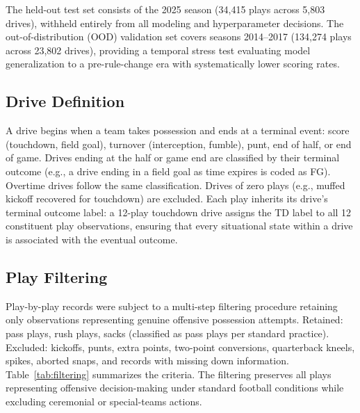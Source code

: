 \documentclass[12pt,a4paper]{article}
\begin{document}
The held-out test set consists of the 2025 season (34,415 plays across 5,803 drives), withheld entirely from all modeling and hyperparameter decisions. The out-of-distribution (OOD) validation set covers seasons 2014--2017 (134,274 plays across 23,802 drives), providing a temporal stress test evaluating model generalization to a pre-rule-change era with systematically lower scoring rates.

\subsection{Drive Definition}

A drive begins when a team takes possession and ends at a terminal event: score (touchdown, field goal), turnover (interception, fumble), punt, end of half, or end of game. Drives ending at the half or game end are classified by their terminal outcome (e.g., a drive ending in a field goal as time expires is coded as FG). Overtime drives follow the same classification. Drives of zero plays (e.g., muffed kickoff recovered for touchdown) are excluded. Each play inherits its drive's terminal outcome label: a 12-play touchdown drive assigns the TD label to all 12 constituent play observations, ensuring that every situational state within a drive is associated with the eventual outcome.

\subsection{Play Filtering}

Play-by-play records were subject to a multi-step filtering procedure retaining only observations representing genuine offensive possession attempts. Retained: pass plays, rush plays, sacks (classified as pass plays per standard practice). Excluded: kickoffs, punts, extra points, two-point conversions, quarterback kneels, spikes, aborted snaps, and records with missing down information. Table~\ref{tab:filtering} summarizes the criteria. The filtering preserves all plays representing offensive decision-making under standard football conditions while excluding ceremonial or special-teams actions.
\end{document}
